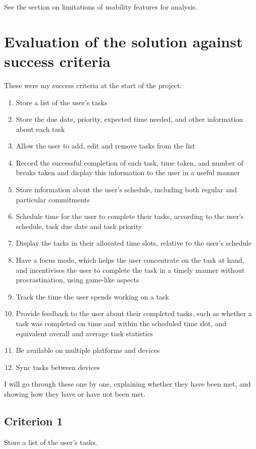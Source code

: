 \documentclass{article}
\begin{document}
See the section on limitations of usability features for analysis.

\section{Evaluation of the solution against success criteria}
These were my success criteria at the start of the project:
\begin{samepage}
	\begin{enumerate}
		\item Store a list of the user's tasks
		\item Store the due date, priority, expected time needed, and other information
		      about each task
		\item Allow the user to add, edit and remove tasks from the list
		\item Record the successful completion of each task, time taken, and number of
		      breaks taken and display this information to the user in a useful manner
		\item Store information about the user's schedule,
		      including both regular and particular commitments
		\item Schedule time for the user to complete their tasks, according to the
		      user's schedule, task due date and task priority
		\item Display the tasks in their allocated time slots,
		      relative to the user's schedule
		\item Have a focus mode, which helps the user concentrate on the task at hand,
		      and incentivises the user to complete the task in a timely manner without
		      procrastination, using game-like aspects
		\item Track the time the user spends working on a task
		\item Provide feedback to the user about their completed tasks,
		      such as whether a task was completed on time and within the scheduled time slot,
		      and equivalent overall and average task statistics
		\item Be available on multiple platforms and devices
		\item Sync tasks between devices
	\end{enumerate}
\end{samepage}

I will go through these one by one,
explaining whether they have been met,
and showing how they have or have not been met.

\subsection*{Criterion 1}
Store a list of the user's tasks.
\end{document}
